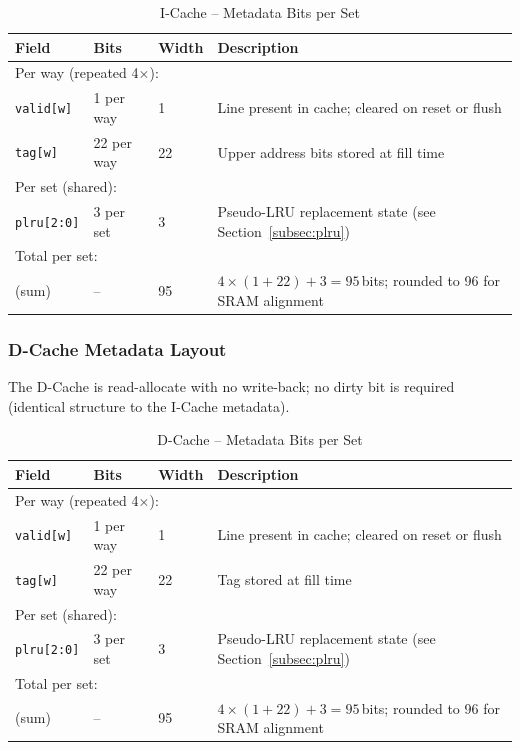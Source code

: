 \begin{table}[H]
\caption{I-Cache -- Metadata Bits per Set}
\label{tab:asICacheTag}
\centering
\begin{tabularx}{\textwidth}{|l |l |l |X|}
  \hline
  Field & Bits & Width & Description \\
  \hline
  \hline
  \multicolumn{4}{|l|}{Per way (repeated 4$\times$):} \\
  \hline
  \texttt{valid[w]}  & 1 per way  & 1  & Line present in cache; cleared on reset or flush \\
  \hline
  \texttt{tag[w]}    & 22 per way & 22 & Upper address bits stored at fill time \\
  \hline
  \multicolumn{4}{|l|}{Per set (shared):} \\
  \hline
  \texttt{plru[2:0]} & 3 per set  & 3  & Pseudo-LRU replacement state (see Section~\ref{subsec:plru}) \\
  \hline
  \multicolumn{4}{|l|}{Total per set:} \\
  \hline
  (sum) & -- & 95 & $4 \times (1+22) + 3 = 95$\,bits; rounded to 96 for SRAM alignment \\
  \hline
\end{tabularx}
\end{table}

\subsubsection{D-Cache Metadata Layout}

The D-Cache is read-allocate with no write-back; no dirty bit is required
(identical structure to the I-Cache metadata).

\begin{table}[H]
\caption{D-Cache -- Metadata Bits per Set}
\label{tab:asDCacheTag}
\centering
\begin{tabularx}{\textwidth}{|l |l |l |X|}
  \hline
  Field & Bits & Width & Description \\
  \hline
  \hline
  \multicolumn{4}{|l|}{Per way (repeated 4$\times$):} \\
  \hline
  \texttt{valid[w]}  & 1 per way  & 1  & Line present in cache; cleared on reset or flush \\
  \hline
  \texttt{tag[w]}    & 22 per way & 22 & Tag stored at fill time \\
  \hline
  \multicolumn{4}{|l|}{Per set (shared):} \\
  \hline
  \texttt{plru[2:0]} & 3 per set  & 3  & Pseudo-LRU replacement state (see Section~\ref{subsec:plru}) \\
  \hline
  \multicolumn{4}{|l|}{Total per set:} \\
  \hline
  (sum) & -- & 95 & $4 \times (1+22) + 3 = 95$\,bits; rounded to 96 for SRAM alignment \\
  \hline
\end{tabularx}
\end{table}

